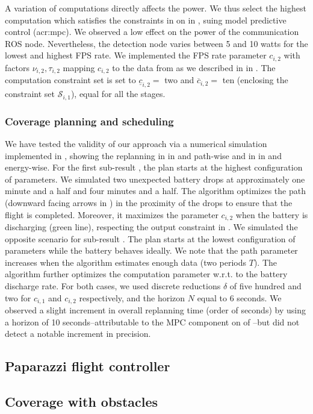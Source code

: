 A variation of computations directly affects the power. We thus select the highest computation which satisfies the constraints in  on  in , suing model predictive control (\Gls{acr:mpc}). We observed a low effect on the power of the communication ROS node. Nevertheless, the detection node varies between 5 and 10 watts for the lowest and highest FPS rate. We implemented the FPS rate parameter $c_{i,2}$ with factors  $\nu_{i,2},\tau_{i,2}$ mapping $c_{i,2}$ to the data from \powprof{} as we described in  in . The computation constraint set is set to $\underline{c}_{i,2}=$ two and $\overline{c}_{i,2}=$ ten (enclosing the constraint set $\mathcal{S}_{i,1}$), equal for all the stages.

\subsubsection*{Coverage planning and scheduling}

We have tested the validity of our approach via a numerical simulation implemented in \matlab, showing the replanning in  in  and  path-wise and in  in  and  energy-wise. For the first sub-result , the plan starts at the highest configuration of parameters. We simulated two unexpected battery drops at approximately one minute and a half and four minutes and a half. The algorithm optimizes the path (downward facing arrows in ) in the proximity of the drops to ensure that the flight is completed. Moreover, it maximizes the parameter $c_{i,2}$ when the battery is discharging (green line), respecting the output constraint in . We simulated the opposite scenario for sub-result . The plan starts at the lowest configuration of parameters while the battery behaves ideally. We note that the path parameter increases when the algorithm estimates enough data (two periods $T$). The algorithm further optimizes the computation parameter w.r.t. to the battery discharge rate. For both cases, we used discrete reductions $\delta$ of five hundred and two for $c_{i,1}$ and $c_{i,2}$ respectively, and the horizon $N$ equal to 6 seconds. We observed a slight increment in overall replanning time (order of seconds) by using a horizon of 10 seconds--attributable to the MPC component on  of --but did not detect a notable increment in precision. 


\subsection{\color{red}Paparazzi flight controller}
\label{sec:res-papa}

\subsection{\color{red}Coverage with obstacles}
\label{sec:res-obsta}
